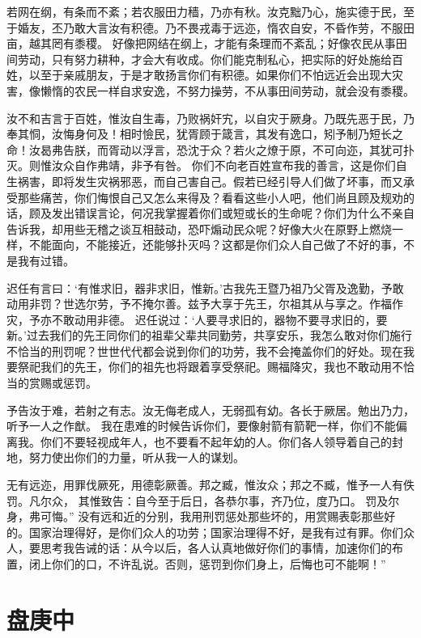 \documentclass[12pt,UTF8]{ctexbook}
\begin{document}
若网在纲，有条而不紊；若农服田力穑，乃亦有秋。汝克黜乃心，施实德于民，至于婚友，丕乃敢大言汝有积德。乃不畏戎毒于远迩，惰农自安，不昏作劳，不服田亩，越其罔有黍稷。
好像把网结在纲上，才能有条理而不紊乱；好像农民从事田间劳动，只有努力耕种，才会大有收成。你们能克制私心，把实际的好处施给百姓，以至于亲戚朋友，于是才敢扬言你们有积德。如果你们不怕远近会出现大灾害，像懒惰的农民一样自求安逸，不努力操劳，不从事田间劳动，就会没有黍稷。

汝不和吉言于百姓，惟汝自生毒，乃败祸奸宄，以自灾于厥身。乃既先恶于民，乃奉其恫，汝悔身何及！相时憸民，犹胥顾于箴言，其发有逸口，矧予制乃短长之命！汝曷弗告朕，而胥动以浮言，恐沈于众？若火之燎于原，不可向迩，其犹可扑灭。则惟汝众自作弗靖，非予有咎。
你们不向老百姓宣布我的善言，这是你们自生祸害，即将发生灾祸邪恶，而自己害自己。假若已经引导人们做了坏事，而又承受那些痛苦，你们悔恨自己又怎么来得及？看看这些小人吧，他们尚且顾及规劝的话，顾及发出错误言论，何况我掌握着你们或短或长的生命呢？你们为什么不亲自告诉我，却用些无稽之谈互相鼓动，恐吓煽动民众呢？好像大火在原野上燃烧一样，不能面向，不能接近，还能够扑灭吗？这都是你们众人自己做了不好的事，不是我有过错。

迟任有言曰：‘有惟求旧，器非求旧，惟新。’古我先王暨乃祖乃父胥及逸勤，予敢动用非罚？世选尔劳，予不掩尔善。兹予大享于先王，尔祖其从与享之。作福作灾，予亦不敢动用非德。
迟任说过：‘人要寻求旧的，器物不要寻求旧的，要新。’过去我们的先王同你们的祖辈父辈共同勤劳，共享安乐，我怎么敢对你们施行不恰当的刑罚呢？世世代代都会说到你们的功劳，我不会掩盖你们的好处。现在我要祭祀我们的先王，你们的祖先也将跟着享受祭祀。赐福降灾，我也不敢动用不恰当的赏赐或惩罚。

予告汝于难，若射之有志。汝无侮老成人，无弱孤有幼。各长于厥居。勉出乃力，听予一人之作猷。
我在患难的时候告诉你们，要像射箭有箭靶一样，你们不能偏离我。你们不要轻视成年人，也不要看不起年幼的人。你们各人领导着自己的封地，努力使出你们的力量，听从我一人的谋划。

无有远迩，用罪伐厥死，用德彰厥善。邦之臧，惟汝众；邦之不臧，惟予一人有佚罚。凡尔众， 其惟致告：自今至于后日，各恭尔事，齐乃位，度乃口。 罚及尔身，弗可悔。”
没有远和近的分别，我用刑罚惩处那些坏的，用赏赐表彰那些好的。国家治理得好，是你们众人的功劳；国家治理得不好，是我有过有罪。你们众人，要思考我告诫的话：从今以后，各人认真地做好你们的事情，加速你们的布置，闭上你们的口，不许乱说。否则，惩罚到你们身上，后悔也可不能啊！”

\chapter{盘庚中}
\end{document}
